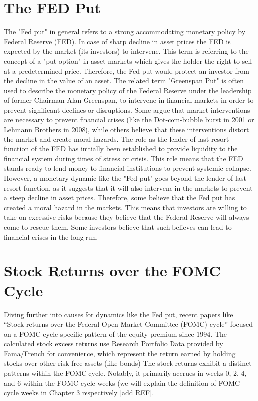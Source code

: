 \section{The FED Put}
The "Fed put" in general refers to a strong accommodating monetary policy by Federal Reserve (FED). In case of sharp decline in asset prices the FED is expected by the market (its investors) to intervene. \parencite{FED_Put_dynamic_explained }
This term is referring to the concept of a "put option" in asset markets which gives the holder the right to sell at a predetermined price.
Therefore, the Fed put would protect an investor from the decline in the value of an asset. 
The related term "Greenspan Put" is often used to describe the monetary policy of the Federal Reserve under the leadership of former Chairman Alan Greenspan, to intervene in financial markets in order to prevent significant declines or disruptions. 
Some argue that market interventions are necessary to prevent financial crises (like the Dot-com-bubble burst in 2001 or Lehmann Brothers in 2008), while others believe that these interventions distort the market and create moral hazards.  \parencite{cieslak_economics_2020}
The role as the lender of last resort function of the FED has initially been established to provide liquidity to the financial system during times of stress or crisis.  \parencite{ The role as the lender of last resort function }
This role means that the FED stands ready to lend money to financial institutions to prevent systemic collapse. 
However, a monetary dynamic like the "Fed put" goes beyond the lender of last resort function, as it suggests that it will also intervene in the markets to prevent a steep decline in asset prices.
Therefore, some believe that the Fed put has created a moral hazard in the markets.  \parencite{FED moral hazard} 
This means that investors are willing to take on excessive risks because they believe that the Federal Reserve will always come to rescue them. Some investors believe that such believes can lead to financial crises in the long run. 

\section{Stock Returns over the FOMC Cycle}

Diving further into causes for dynamics like the Fed put, recent papers like “Stock returns over the Federal Open Market Committee (FOMC) cycle” focused on a FOMC cycle specific pattern of the equity premium since 1994. 
The calculated stock excess returns use Research Portfolio Data provided by Fama/French\parencite{Fama/French Factors} for convenience, which represent the return earned by holding stocks over other risk-free assets (like bonds)
The stock returns exhibit a distinct patterns within the FOMC cycle. Notably, it primarily accrues in weeks 0, 2, 4, and 6 within the FOMC cycle weeks (we will explain the definition of FOMC cycle weeks in Chapter 3 respectively \ref{add REF}.

